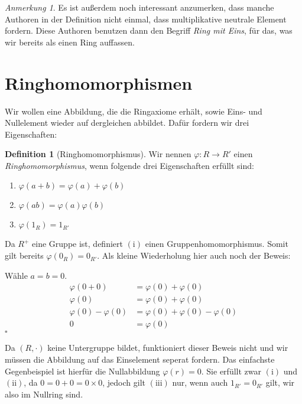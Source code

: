 \documentclass{article}
\theoremstyle{definition}
\newtheorem*{definition}{Definition}
\theoremstyle{remark}
\newtheorem*{anm}{Anmerkung}
\begin{document}
\begin{anm} Es ist außerdem noch interessant anzumerken, dass manche Authoren in der Definition nicht einmal,
dass multiplikative neutrale Element fordern. Diese Authoren benutzen dann den Begriff \emph{Ring mit Eins},
für das, was wir bereits als einen Ring auffassen.
\end{anm}

\newpage
\section{Ringhomomorphismen}

Wir wollen eine Abbildung, die die Ringaxiome erhält, sowie Eins- und Nullelement wieder auf dergleichen
abbildet. Dafür fordern wir drei Eigenschaften:

\begin{definition}[Ringhomomorphismus] Wir nennen $\varphi: R\to R'$ einen \emph{Ringhomomorphismus}, wenn
folgende drei Eigenschaften erfüllt sind: \begin{enumerate}[label=(\roman*)]
    \item $\varphi(a+b) = \varphi(a) + \varphi(b)$
    \item $\varphi(a b) = \varphi(a)   \varphi(b)$
    \item $\varphi(1_R) = 1_{R'}$
\end{enumerate}
\end{definition}

Da $R^+$ eine Gruppe ist, definiert $(\mathrm i)$ einen Gruppenhomomorphismus. Somit gilt bereits
$\varphi(0_R)=0_{R'}$. Als kleine Wiederholung hier auch noch der Beweis:

Wähle $a=b=0$.
\begin{align*}
\varphi(0+0) &= \varphi(0)+\varphi(0) \\
\varphi(0) &= \varphi(0)+\varphi(0) \\
\varphi(0)-\varphi(0) &= \varphi(0)+\varphi(0)-\varphi(0) \\
0 &= \varphi(0)
\end{align*}
\hfill$\square$

Da $(R,\cdot)$ keine Untergruppe bildet, funktioniert dieser Beweis nicht und wir müssen die Abbildung auf das
Einselement seperat fordern. Das einfachste Gegenbeispiel ist hierfür die Nullabbildung $\varphi(r)=0$. Sie
erfüllt zwar $(\mathrm{i})$ und $(\mathrm{ii})$, da $0=0+0=0\times0$, jedoch gilt $(\mathrm{iii})$ nur, wenn auch
$1_{R'}=0_{R'}$ gilt, wir also im Nullring sind. 
\end{document}
